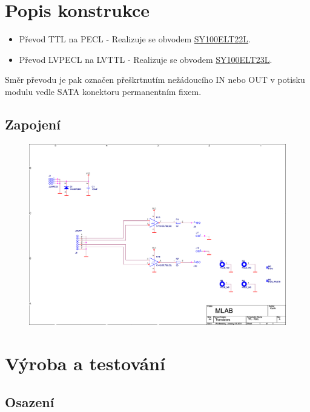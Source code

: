 \documentclass[12pt,a4paper,oneside]{article}
\begin{document}
\newpage
\section{Popis konstrukce}

\begin{itemize}
\item
  Převod TTL na PECL - Realizuje se obvodem
  \href{http://www.micrel.com/page.do?page=/product-info/products/sy10-100elt22l.shtml}{SY100ELT22L}.
\item
  Převod LVPECL na LVTTL - Realizuje se obvodem
  \href{http://www.micrel.com/page.do?page=/product-info/products/sy10-100elt23l.shtml}{SY100ELT23L}.
\end{itemize}
Směr převodu je pak označen přeškrtnutím nežádoucího IN nebo OUT v
potisku modulu vedle SATA konektoru permanentním fixem.


\subsection{Zapojení}

\begin{figure} [htbp]
  \includegraphics[trim = 5mm 50mm 80mm 15mm, clip, width=15cm]{../../SCH/ttlpecl.pdf}
\end{figure}

\section{Výroba a testování}

\subsection{Osazení}
\end{document}
